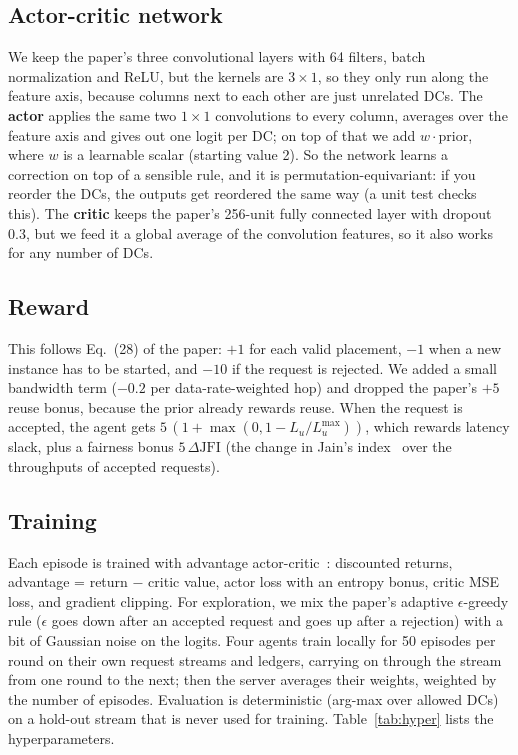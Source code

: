 \documentclass[11pt,a4paper]{article}
\begin{document}
\subsection{Actor-critic network}
We keep the paper's three convolutional layers with 64 filters, batch
normalization and ReLU, but the kernels are $3\times1$, so they only run along
the feature axis, because columns next to each other are just unrelated DCs. The
\textbf{actor} applies the same two $1\times1$ convolutions to every column,
averages over the feature axis and gives out one logit per DC; on top of that we
add $w\cdot\text{prior}$, where $w$ is a learnable scalar (starting value 2). So
the network learns a correction on top of a sensible rule, and it is
permutation-equivariant: if you reorder the DCs, the outputs get reordered the
same way (a unit test checks this). The \textbf{critic} keeps the paper's
256-unit fully connected layer with dropout 0.3, but we feed it a global average
of the convolution features, so it also works for any number of DCs.

\subsection{Reward}\label{sec:reward}
This follows Eq.~(28) of the paper: $+1$ for each valid placement, $-1$ when a
new instance has to be started, and $-10$ if the request is rejected. We added a
small bandwidth term ($-0.2$ per data-rate-weighted hop) and dropped the paper's
$+5$ reuse bonus, because the prior already rewards reuse. When the request is
accepted, the agent gets $5\,(1 + \max(0,1 - L_u/L^{\max}_u))$, which rewards
latency slack, plus a fairness bonus $5\,\Delta\mathrm{JFI}$ (the change in
Jain's index~\cite{jain} over the throughputs of accepted requests).

\subsection{Training}
Each episode is trained with advantage actor-critic~\cite{a3c}: discounted
returns, advantage = return $-$ critic value, actor loss with an entropy bonus,
critic MSE loss, and gradient clipping. For exploration, we mix the paper's
adaptive $\epsilon$-greedy rule ($\epsilon$ goes down after an accepted request
and goes up after a rejection) with a bit of Gaussian noise on the logits. Four
agents train locally for 50 episodes per round on their own request streams and
ledgers, carrying on through the stream from one round to the next; then the
server averages their weights, weighted by the number of episodes. Evaluation is
deterministic (arg-max over allowed DCs) on a hold-out stream that is never used
for training. Table~\ref{tab:hyper} lists the hyperparameters.
\end{document}
